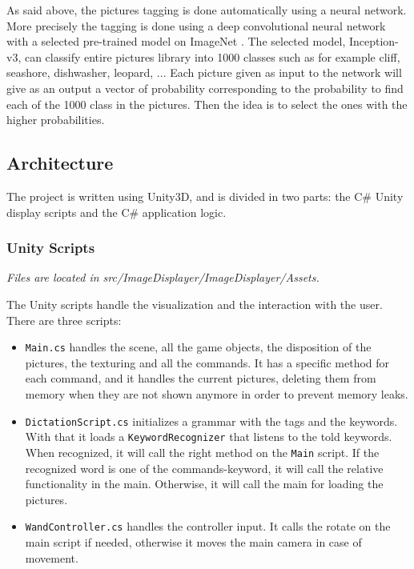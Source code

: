 \documentclass[11pt,a4paper]{article}
\begin{document}
As said above, the pictures tagging is done automatically using a neural network. More precisely the tagging is done using a deep convolutional neural network with a selected pre-trained model on ImageNet . The selected model, Inception-v3, can classify entire pictures library into 1000 classes such as for example cliff, seashore, dishwasher, leopard, ... Each picture given as input to the network will give as an output a vector of probability corresponding to the probability to find each of the 1000 class in the pictures. Then the idea is to select the ones with the higher probabilities.


\subsection{Architecture}


The project is written using Unity3D, and is divided in two parts: the C$\#$ Unity display scripts and the C$\#$ application logic.

\subsubsection{Unity Scripts}
\textit{Files are located in src/ImageDisplayer/ImageDisplayer/Assets.}

The Unity scripts handle the visualization and the interaction with the user. 
There are three scripts:
\begin{itemize}
\item\texttt{Main.cs} handles the scene, all the game objects, the disposition of the pictures, the texturing and all the commands.
It has a specific method for each command, and it handles the current pictures, deleting them from memory when they are not shown anymore in order to prevent memory leaks.
\item \texttt{DictationScript.cs} initializes a grammar with the tags and the keywords. With that it loads a \texttt{KeywordRecognizer} that listens to the told keywords. When recognized, it will call the right method on the \texttt{Main} script.
If the recognized word is one of the commands-keyword, it will call the relative functionality in the main.
Otherwise, it will call the main for loading the pictures.
\item\texttt{WandController.cs} handles the controller input. It calls the rotate on the main script if needed, otherwise it moves the main camera in case of movement.
\end{itemize}
\end{document}
